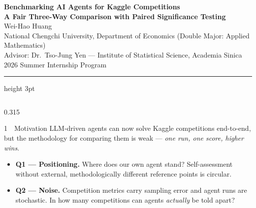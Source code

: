 \documentclass[final]{beamer}
\newcommand{\highlight}[1]{\textcolor{accent}{\textbf{#1}}}
\begin{document}
\begin{frame}[t]

\begin{center}
  \vspace{0.6cm}
  {\VERYHuge\bfseries\textcolor{main}{Benchmarking AI Agents for Kaggle Competitions}}\\[0.5ex]
  {\Huge\bfseries\textcolor{main}{A Fair Three-Way Comparison with Paired Significance Testing}}\\[1.2ex]
  {\LARGE Wei-Hao Huang}\\[0.6ex]
  {\Large National Chengchi University, Department of Economics (Double Major: Applied Mathematics)}\\[0.4ex]
  {\Large Advisor: Dr.\ Tso-Jung Yen --- Institute of Statistical Science, Academia Sinica}\\[0.4ex]
  {\large 2026 Summer Internship Program}
  \vspace{0.4cm}
\end{center}
\vspace{-0.2cm}
{\color{main}\hrule height 3pt}
\vspace{0.8cm}

\begin{columns}[t]

\begin{column}{0.315\textwidth}

\begin{block}{1~~Motivation}
LLM-driven agents can now solve Kaggle competitions end-to-end, but the methodology for comparing them is weak --- \emph{one run, one score, higher wins}.
\begin{itemize}
  \item \highlight{Q1 --- Positioning.} Where does our own agent stand? Self-assessment without external, methodologically different reference points is circular.
  \item \highlight{Q2 --- Noise.} Competition metrics carry sampling error and agent runs are stochastic. In how many competitions can agents \emph{actually} be told apart?
\end{itemize}
\end{block}


\end{column}
\end{columns}
\end{frame}
\end{document}
